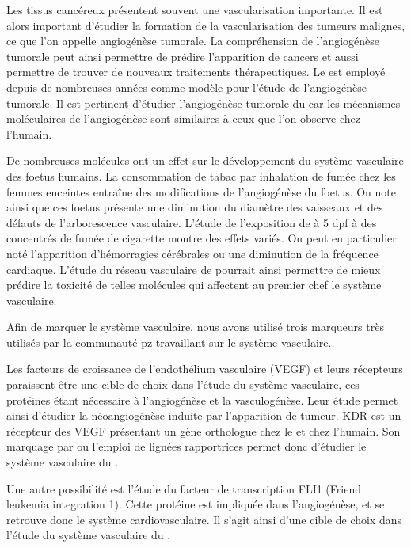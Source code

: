\documentclass[\main/main.tex]{subfiles}
\begin{document}
%
Les tissus cancéreux présentent souvent une vascularisation importante.
%
Il est alors important d'étudier la formation de la vascularisation des tumeurs malignes, ce que l'on appelle angiogénèse tumorale.
%
La compréhension de l'angiogénèse tumorale peut ainsi permettre de prédire
l'apparition de cancers et aussi permettre de trouver de nouveaux traitements
thérapeutiques.
%
Le \pz{} est employé depuis de nombreuses années comme modèle pour l'étude de l'angiogénèse tumorale\cite{nicoli_2007,guerra_2020,letrado_2018}.
%
Il est pertinent d'étudier l'angiogénèse tumorale du \pz{} car les mécanismes moléculaires de l'angiogénèse sont similaires à ceux que l'on observe chez l'humain\cite{tobia_2011}.

%
De nombreuses molécules ont un effet sur le développement du système vasculaire des foetus humains\cite{knudsen_2011}.
%
La consommation de tabac par inhalation de fumée chez les femmes enceintes
entraîne des modifications de l'angiogénèse du foetus.
%
On note ainsi que ces foetus présente une diminution du diamètre des vaisseaux
et des défauts de l'arborescence vasculaire.
%
L'étude de l'exposition de \pz{} à 5 dpf à des concentrés de fumée de cigarette
montre des effets variés\cite{ellis_2014,massarsky_2018}.
%
On peut en particulier noté l'apparition d'hémorragies cérébrales ou une diminution de la fréquence cardiaque.
%
L'étude du réseau vasculaire de \pz{} pourrait ainsi permettre de mieux prédire la toxicité de telles molécules qui affectent au premier chef le système vasculaire.%

%
Afin de marquer le système vasculaire, nous avons utilisé trois marqueurs très utilisés par la communauté pz travaillant sur le système vasculaire..
%

Les facteurs de croissance de l'endothélium vasculaire (VEGF) et leurs récepteurs paraissent être une cible de choix dans l'étude du système vasculaire,
ces protéines étant nécessaire à  l'angiogénèse et la vasculogénèse\cite{bahari_2007}.
%
Leur étude permet ainsi d'étudier la néoangiogénèse induite par l'apparition de tumeur\cite{nicoli_2007}.
%
KDR est un récepteur des VEGF présentant un gène orthologue chez le \pz{} et chez l'humain.
%
Son marquage par \ihcie{} ou l'emploi de lignées rapportrices permet donc d'étudier le système vasculaire du \pz{}\cite{savage_2019}.

Une autre possibilité est l'étude du facteur de transcription FLI1 (Friend leukemia integration 1).
%
Cette protéine est impliquée dans l'angiogénèse, et se retrouve donc le système cardiovasculaire.
%
Il s'agit ainsi d'une cible de choix dans l'étude du système vasculaire du \pz{}\cite{letrado_2018}.
\end{document}
